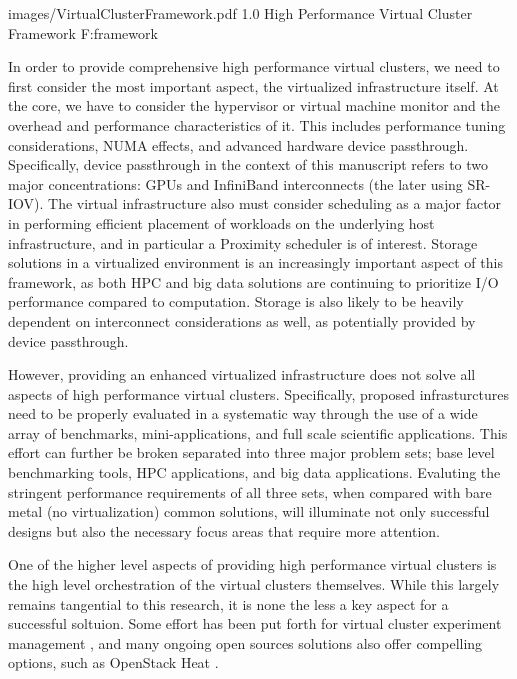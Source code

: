   {images/VirtualClusterFramework.pdf}
  {1.0}
  {High Performance Virtual Cluster Framework}
  {F:framework}

In order to provide comprehensive high performance virtual clusters, we need to first consider the most important aspect, the virtualized infrastructure itself. At the core, we have to consider the hypervisor or virtual machine monitor and the overhead and performance characteristics of it. This includes performance tuning considerations, NUMA effects, and advanced hardware device passthrough. Specifically, device passthrough in the context of this manuscript refers to two major concentrations: GPUs and InfiniBand interconnects (the later using SR-IOV). The virtual infrastructure also must consider scheduling as a major factor in performing efficient placement of workloads on the underlying host infrastructure, and in particular a Proximity scheduler is of interest. Storage solutions in a virtualized environment is an increasingly important aspect of this framework, as both HPC and big data solutions are continuing to prioritize I/O performance compared to computation. Storage is also likely to be heavily dependent on interconnect considerations as well, as potentially provided by device passthrough.  

However, providing an enhanced virtualized infrastructure does not solve all aspects of high performance virtual clusters. Specifically, proposed infrasturctures need to be properly evaluated in a systematic way through the use of a wide array of benchmarks, mini-applications, and full scale scientific applications. This effort can further be broken separated into three major problem sets; base level benchmarking tools, HPC applications, and big data applications. Evaluting the stringent performance requirements of all three sets, when compared with bare metal (no virtualization) common solutions, will illuminate not only successful designs but also the necessary focus areas that require more attention.

One of the higher level aspects of providing high performance virtual clusters is the high level orchestration of the virtual clusters themselves. While this largely remains tangential to this research, it is none the less a key aspect for a successful soltuion. Some effort has been put forth for virtual cluster experiment management \cite{futureGrid-experiment-management}, and many ongoing open sources solutions also offer compelling options, such as OpenStack Heat \cite{openstack-heat}.  


